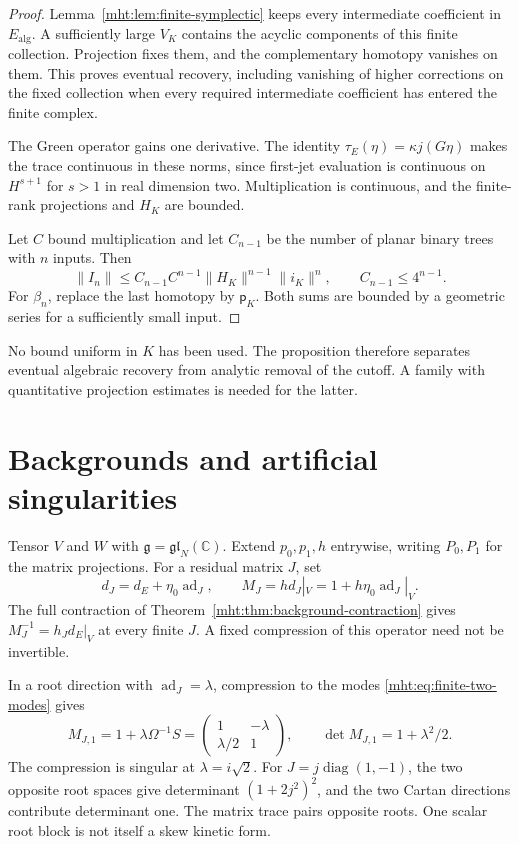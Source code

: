 \begin{proof}
Lemma~\ref{mht:lem:finite-symplectic} keeps every intermediate
coefficient in $E_{\mathrm{alg}}$. A sufficiently large $V_K$
contains the acyclic components of this finite collection. Projection
fixes them, and the complementary homotopy vanishes on them. This
proves eventual recovery, including vanishing of higher corrections
on the fixed collection when every required intermediate coefficient
has entered the finite complex.

The Green operator gains one derivative. The identity
$\tau_E(\eta)=\kappa j(G\eta)$ makes the trace continuous in these
norms, since first-jet evaluation is continuous on $H^{s+1}$ for
$s>1$ in real dimension two. Multiplication is continuous, and the
finite-rank projections and $H_K$ are bounded.

Let $C$ bound
multiplication and let $C_{n-1}$ be the number of planar binary
trees with $n$ inputs. Then
\[
 \|I_n\|\leq C_{n-1}C^{n-1}\|H_K\|^{n-1}\|i_K\|^n,
 \qquad C_{n-1}\leq4^{n-1}.
\]
For $\beta_n$, replace the last homotopy by $\mathsf p_K$. Both sums are
bounded by a geometric series for a sufficiently small input.
\end{proof}

No bound uniform in $K$ has been used. The proposition therefore
separates eventual algebraic recovery from analytic removal of the
cutoff. A family with quantitative projection estimates is needed
for the latter.

\section{Backgrounds and artificial singularities}

Tensor $V$ and $W$ with $\mathfrak g=\mathfrak{gl}_N(\mathbb C)$.
Extend $p_0,p_1,h$ entrywise, writing $P_0,P_1$ for the matrix
projections. For a residual matrix $J$, set
\[
 d_J=d_E+\eta_0\operatorname{ad}_J,
 \qquad M_J=hd_J|_V=1+h\eta_0\operatorname{ad}_J|_V.
\]
The full contraction of
Theorem~\ref{mht:thm:background-contraction} gives
$M_J^{-1}=h_Jd_E|_V$ at every finite $J$. A fixed compression of
this operator need not be invertible.

\begin{example}\label{mht:ex:compressed-pole}
In a root direction with $\operatorname{ad}_J=\lambda$, compression
to the modes \eqref{mht:eq:finite-two-modes} gives
\begin{equation}\label{mht:eq:compressed-pole}
 M_{J,1}=1+\lambda\Omega^{-1}S
       =\begin{pmatrix}1&-\lambda\\\lambda/2&1\end{pmatrix},
 \qquad \det M_{J,1}=1+\lambda^2/2.
\end{equation}
The compression is singular at $\lambda=i\sqrt2$. For
$J=j\operatorname{diag}(1,-1)$, the two opposite root spaces
give determinant $(1+2j^2)^2$, and the two Cartan directions
contribute determinant one. The matrix trace pairs opposite roots.
One scalar root block is not itself a skew kinetic form.
\end{example}

